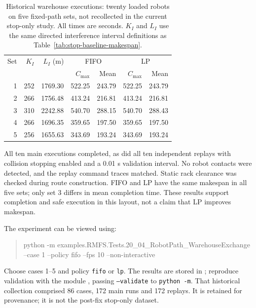 \documentclass[11pt,a4paper]{article}
\theoremstyle{remark}
\begin{document}
\begin{table}[htbp]
\centering\small
\caption{Historical warehouse executions: twenty loaded robots on five fixed-path sets, not recollected in the current stop-only study.
All times are seconds. $K_I$ and $L_I$ use the same directed interference
interval definitions as Table~\ref{tab:stop-baseline-makespan}.}
\label{tab:warehouse-results}
\begin{tabular}{rrrrrrr}
\toprule
Set & $K_I$ & $L_I$ (m) & \multicolumn{2}{c}{FIFO} & \multicolumn{2}{c}{LP}\\
 & & & $C_{\max}$ & Mean & $C_{\max}$ & Mean\\
\midrule
1 & 252 & 1769.30 & 522.25 & 243.79 & 522.25 & 243.79\\
2 & 266 & 1756.48 & 413.24 & 216.81 & 413.24 & 216.81\\
3 & 310 & 2242.88 & 540.70 & 288.15 & 540.70 & 288.43\\
4 & 266 & 1696.35 & 359.65 & 197.50 & 359.65 & 197.50\\
5 & 256 & 1655.63 & 343.69 & 193.24 & 343.69 & 193.24\\
\bottomrule
\end{tabular}
\end{table}
All ten main executions completed, as did all ten independent replays
with collision stopping enabled and a 0.01 s validation interval. No robot
contacts were detected, and the replay command traces matched. Static
rack clearance was checked during route construction. FIFO and LP have
the same makespan in all five sets; only set 3 differs in mean completion
time. These results support completion and safe execution in this layout,
not a claim that LP improves makespan.

The experiment can be viewed using:
\begin{quote}\small\ttfamily
python -m examples.RMFS.Tests.20\_04\_RobotPath\_WarehouseExchange\\
\hspace*{1em}--case 1 --policy fifo --fps 10 --non-interactive
\end{quote}
\begin{sloppypar}
Choose cases 1--5 and policy \texttt{fifo} or \texttt{lp}. The results are
stored in ; reproduce
validation with the module ,
passing \texttt{--validate} to \texttt{python -m}.
That historical collection comprised 86 cases, 172 main runs and 172 replays.
It is retained for provenance; it is not the post-fix stop-only dataset.
\end{sloppypar}
\end{document}
